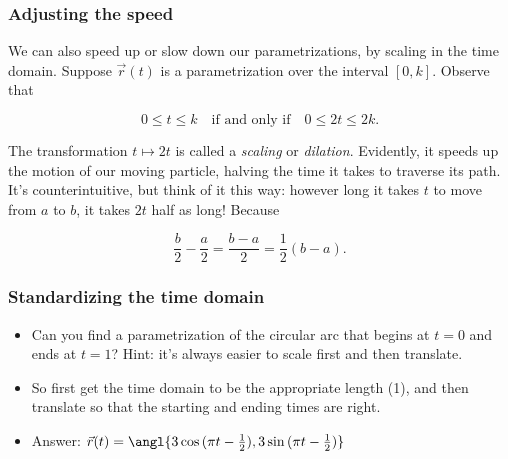 \documentclass[11pt,ignorenonframetext,aspectratio=169,xcolor={svgnames}]{beamer}
\begin{document}
\begin{frame}\frametitle{Adjusting the speed}

We can also speed up or slow down our parametrizations, by scaling in
the time domain. Suppose $\vec{r}(t)$ is a parametrization over the
interval $[0, k]$. Observe that

\begin{equation*}
    0 \leq t \leq k \quad \text{if and only if} \quad 0 \leq 2t \leq 2k.
\end{equation*}

The transformation $t \mapsto 2t$ is called a \emph{scaling} or
\emph{dilation}. Evidently, it speeds up the motion of our moving
particle, halving the time it takes to traverse its path. It's
counterintuitive, but think of it this way: however long it takes $t$ to
move from $a$ to $b$, it takes $2t$ half as long! Because

\begin{equation*}
    \frac{b}{2} - \frac{a}{2} = \frac{b-a}{2} = \frac{1}{2}(b-a).
\end{equation*}

\end{frame}

\begin{frame}\frametitle{Standardizing the time domain}

\begin{itemize}[<+->]
\itemsep1pt\parskip0pt
\item
  Can you find a parametrization of the circular arc that begins at
  $t = 0$ and ends at $t = 1$? Hint: it's always easier to scale first
  and then translate.
\item
  So first get the time domain to be the appropriate length (1), and
  then translate so that the starting and ending times are right.
\item
  Answer:
  $\vec{r}(t) = \angl{3 \cos{(\pi t - \frac{1}{2})}, 3 \sin{(\pi t - \frac{1}{2})}}$
\end{itemize}

\end{frame}
\end{document}
